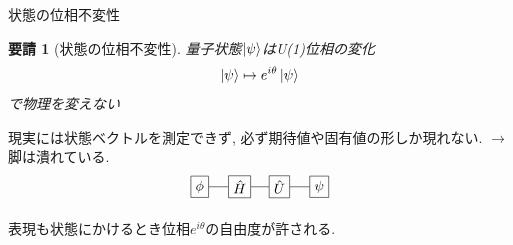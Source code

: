 \documentclass[dvipdfm]{beamer}
\newtheorem*{requirement}{要請}
\newtheorem*{them}{定理}
\newtheorem*{defn}{定義}
\newtheorem*{exmpl}{例}
\begin{document}
\begin{frame}{状態の位相不変性}
    \begin{requirement}[状態の位相不変性]
        量子状態$\ket{\psi}$はU(1)位相の変化
        \begin{equation*}
            \ket{\psi}\mapsto e^{i\theta}\ket{\psi}
        \end{equation*}
        で物理を変えない
    \end{requirement}
    現実には状態ベクトルを測定できず, 必ず期待値や固有値の形しか現れない.
    $\rightarrow$脚は潰れている.
    \begin{equation*}
        \begin{tikzpicture}
            \node at(0,0)[draw,rectangle](H){$\hat{H}$};
            \node at(-1,0)[draw,rectangle](f){$\phi$};
            \node at(1,0)[draw,rectangle](U){$\hat{U}$};
            \node at(2,0)[draw,rectangle](y){$\psi$};
            \draw(f.east)--(H.west)(H.east)--(U.west)(U.east)--(y.west);
        \end{tikzpicture}
    \end{equation*}

    表現も状態にかけるとき位相$e^{i\theta}$の自由度が許される.
\end{frame}


\end{document}
